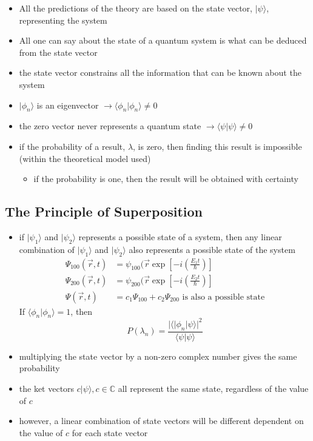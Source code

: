 \documentclass[a4paper,11pt,normalem]{article}
\begin{document}
\begin{itemize}
\item
  All the predictions of the theory are based on the state vector,
  \(|\psi\rangle\), representing the system
\item
  All one can say about the state of a quantum system is what can be
  deduced from the state vector
\item
  the state vector constrains all the information that can be known about
  the system
\item
  \(|\phi_n\rangle\) is an eigenvector
  \(\to \langle \phi_n|\phi_n\rangle \neq 0\)
\item
  the zero vector never represents a quantum state
  \(\to \langle\psi|\psi\rangle \neq 0\)
\item
  if the probability of a result, \(\lambda\), is zero, then finding
  this result is impossible (within the theoretical model used)
  \begin{itemize}
  \item
    if the probability is one, then the result will be obtained with
    certainty
  \end{itemize}
\end{itemize}

\subsection{The Principle of Superposition}\label{the-principle-of-superposition}

\begin{itemize}
\item
  if \(|\psi_1\rangle\) and \(|\psi_2\rangle\) represents a possible
  state of a system, then any linear combination of \(|\psi_1\rangle\)
  and \(|\psi_2\rangle\) also represents a possible state of the system
  \[
  \begin{aligned}
  \Psi_{100}(\vec{r},t) &= \psi_{100}(\vec{r}\exp\left[-i\left(\frac{E_1t}{\hbar}\right)\right] \\
  \Psi_{200}(\vec{r},t) &= \psi_{200}(\vec{r}\exp\left[-i\left(\frac{E_2t}{\hbar}\right)\right] \\
  \Psi(\vec{r},t) &= c_1\Psi_{100} + c_2\Psi_{200} \text{ is also a possible state}
  \end{aligned}
  \]
If \(\langle\phi_n|\phi_n\rangle = 1\), then \[
    P(\lambda_n) = \frac{|\langle|\phi_n|\psi\rangle|^2}{\langle\psi|\psi\rangle}
\]
\item
  multiplying the state vector by a non-zero complex number gives the
  same probability
\item
  the ket vectors \(c|\psi\rangle, c \in \mathbb{C}\) all represent the
  same state, regardless of the value of \(c\)
\item
  however, a linear combination of state vectors will be different
  dependent on the value of \(c\) for each state vector
\end{itemize}
\end{document}
